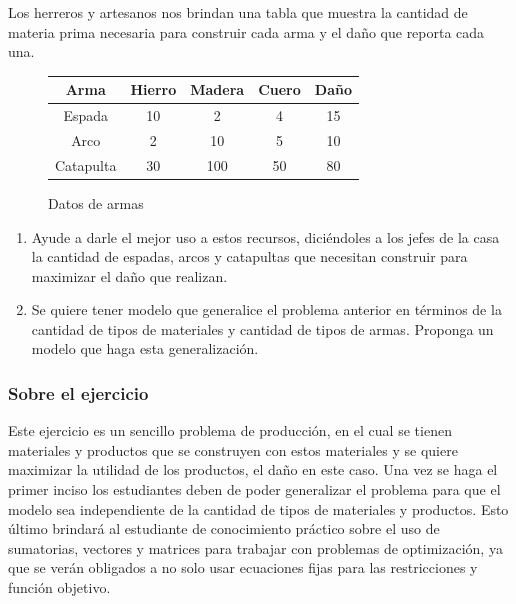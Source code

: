 \documentclass[a4paper,10pt,twocolumn]{article}
\theoremstyle{theorem}
\theoremstyle{definition}
\theoremstyle{remark}
\begin{document}
Los herreros y artesanos nos brindan una tabla que muestra la cantidad de materia prima necesaria para construir cada arma y el daño que reporta cada una.

\begin{figure}[h!]%
	\begin{center}
		\begin{tabular}{|c|c|c|c|c|} \hline
		Arma		& Hierro 	& Madera 	& Cuero   & Daño    \\ \hline
		Espada		& 10		&  2		&  4	  & 15		\\ \hline
		Arco		&  2		& 10		&  5	  & 10		\\ \hline
		Catapulta	& 30		&100		& 50	  & 80		\\ \hline
		\end{tabular}
	\caption{Datos de armas}\label{fig:ejer_1}
	\end{center}
\end{figure}

\renewcommand{\theenumi}{\alph{enumi}} %

\begin{enumerate}

	\item Ayude a darle el mejor uso a estos recursos, diciéndoles a los jefes de la casa la cantidad de espadas, arcos y catapultas que 
	necesitan construir para maximizar el daño que realizan.
	\item Se quiere tener modelo que generalice el problema anterior en términos de la cantidad de tipos de materiales y cantidad de tipos de 
	armas. Proponga un modelo que haga esta generalización.

\end{enumerate}

		\subsubsection{Sobre el ejercicio}\label{subsubsec:sobre_ejer_1}

Este ejercicio es un sencillo problema de producción, en el cual se tienen materiales y productos que se construyen con estos materiales y se quiere maximizar la utilidad de los productos, el daño en este caso. Una vez se haga el primer inciso los estudiantes deben de poder generalizar el problema para que el modelo sea independiente de la cantidad de tipos de materiales y productos. Esto último brindará al estudiante de conocimiento práctico sobre el uso de sumatorias, vectores y matrices para trabajar con problemas de optimización, ya que se verán obligados a no solo usar ecuaciones fijas para las restricciones y función objetivo.
\end{document}
